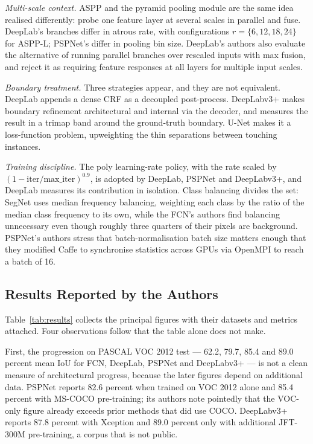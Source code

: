 \documentclass[journal]{IEEEtran}
\begin{document}
\emph{Multi-scale context.} ASPP and the pyramid pooling module are the same idea
realised differently: probe one feature layer at several scales in parallel and fuse.
DeepLab's branches differ in atrous rate, with configurations $r=\{6,12,18,24\}$ for
ASPP-L; PSPNet's differ in pooling bin size. DeepLab's authors also evaluate the
alternative of running parallel branches over rescaled inputs with max fusion, and
reject it as requiring feature responses at all layers for multiple input scales.

\emph{Boundary treatment.} Three strategies appear, and they are not equivalent.
DeepLab appends a dense CRF as a decoupled post-process. DeepLabv3+ makes boundary
refinement architectural and internal via the decoder, and measures the result in a
trimap band around the ground-truth boundary. U-Net makes it a loss-function problem,
upweighting the thin separations between touching instances.

\emph{Training discipline.} The poly learning-rate policy, with the rate scaled by
$(1-\mathrm{iter}/\mathrm{max\_iter})^{0.9}$, is adopted by DeepLab, PSPNet and
DeepLabv3+, and DeepLab measures its contribution in isolation. Class balancing
divides the set: SegNet uses median frequency balancing, weighting each class by the
ratio of the median class frequency to its own, while the FCN's authors find balancing
unnecessary even though roughly three quarters of their pixels are background.
PSPNet's authors stress that batch-normalisation batch size matters enough that they
modified Caffe to synchronise statistics across GPUs via OpenMPI to reach a batch of
16.

\subsection{Results Reported by the Authors}

Table~\ref{tab:results} collects the principal figures with their datasets and
metrics attached. Four observations follow that the table alone does not make.

First, the progression on PASCAL VOC 2012 test --- 62.2, 79.7, 85.4 and 89.0 percent
mean IoU for FCN, DeepLab, PSPNet and DeepLabv3+ --- is not a clean measure of
architectural progress, because the later figures depend on additional data. PSPNet
reports 82.6 percent when trained on VOC 2012 alone and 85.4 percent with MS-COCO
pre-training; its authors note pointedly that the VOC-only figure already exceeds
prior methods that did use COCO. DeepLabv3+ reports 87.8 percent with Xception and
89.0 percent only with additional JFT-300M pre-training, a corpus that is not public.
\end{document}
